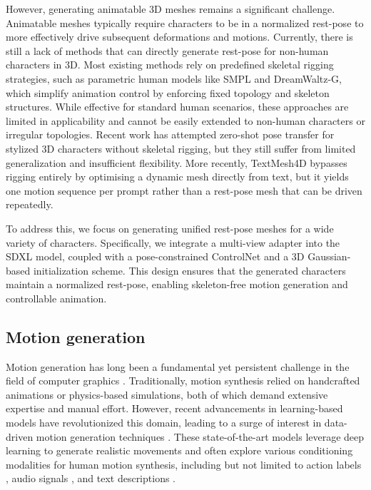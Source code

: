 \documentclass[lettersize,journal]{IEEEtran}
\newcommand{\blu}[1]{\texorpdfstring{{\leavevmode\color{blue}#1}}{#1}}
\begin{document}
However, generating animatable 3D meshes remains a significant challenge. Animatable meshes typically require characters to be in a normalized rest-pose to more effectively drive subsequent deformations and motions. Currently, there is still a lack of methods that can directly generate rest-pose for non-human characters in 3D. Most existing methods rely on predefined skeletal rigging strategies, such as parametric human models like SMPL \cite{loper2015smpl} and DreamWaltz-G\cite{huang2025dreamwaltz}, which simplify animation control by enforcing fixed topology and skeleton structures. While effective for standard human scenarios, these approaches are limited in applicability and cannot be easily extended to non-human characters or irregular topologies. Recent work \cite{wang2023zero} has attempted zero-shot pose transfer for stylized 3D characters without skeletal rigging, but they still suffer from limited generalization and insufficient flexibility.  \blu{More recently, TextMesh4D \cite{dai2025textmesh4d} bypasses
rigging entirely by optimising a dynamic mesh directly from text, but it yields one motion
sequence per prompt rather than a rest-pose mesh that can be driven repeatedly.}

To address this, we focus on generating unified rest-pose meshes for a wide variety of characters. Specifically, we integrate a multi-view adapter into the SDXL model, coupled with a pose-constrained ControlNet and a 3D Gaussian-based initialization scheme. This design ensures that the generated characters maintain a normalized rest-pose, enabling skeleton-free motion generation and controllable animation.


\subsection{Motion generation}
Motion generation has long been a fundamental yet persistent challenge in the field of computer graphics \cite{guo2015adaptive}. Traditionally, motion synthesis relied on handcrafted animations or physics-based simulations, both of which demand extensive expertise and manual effort. However, recent advancements in learning-based models have revolutionized this domain, leading to a surge of interest in data-driven motion generation techniques \cite{holden2015learning, holden2016deep}. These state-of-the-art models leverage deep learning to generate realistic movements and often explore various conditioning modalities for human motion synthesis, including but not limited to action labels \cite{guo2020action2motion, petrovich2021action}, audio signals \cite{xu2022freeform, dabral2022mofusion, deng2025stereo}, and text descriptions \cite{zhang2024motiondiffuse,tevet2022human, chen2022executing}.
\end{document}

